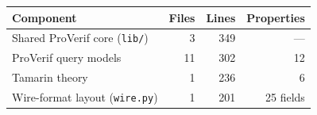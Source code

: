 \begin{tabular}{@{}lrrr@{}}
\toprule
Component & Files & Lines & Properties \\
\midrule
Shared ProVerif core (\texttt{lib/}) & 3 & 349 & --- \\
ProVerif query models & 11 & 302 & 12 \\
Tamarin theory & 1 & 236 & 6 \\
Wire-format layout (\texttt{wire.py}) & 1 & 201 & 25 fields \\
\bottomrule
\end{tabular}
